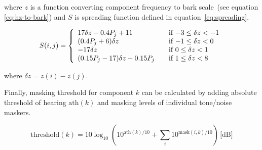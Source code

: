 \documentclass[english,bachelor,a4paper,oneside]{ppfcmthesis}
\begin{document}
where $z$ is a function converting component frequency to bark scale~(see equation \ref{eq:hz-to-bark}) and $S$ is spreading function defined in equation~\ref{eq:spreading}.

\begin{equation}
S(i, j) = \left\{
  \begin{array}{l l}
  17 \delta z -0.4 P_{j} + 11 & \quad \textrm{if $-3 \leq \delta z < -1$}\\
  (0.4P_{j} + 6) \delta z & \quad \textrm{if $-1 \leq \delta z < 0$}\\
  -17 \delta z & \quad \textrm{if $0 \leq \delta z < 1$}\\
  (0.15 P_{j} -17) \delta z - 0.15 P_{j} & \quad \textrm{if $1 \leq \delta z < 8$}
  \end{array}
\right.
\label{eq:spreading}
\end{equation}

where $\delta z = z(i) - z(j)$.


Finally, masking threshold for component $k$ can be calculated by adding absolute threshold of hearing $\textrm{ath}(k)$ and masking levels of individual tone/noise maskers.

\begin{equation}
\textrm{threshold}(k) = 10\log_{10}(10^{\textrm{ath}(k)/10} + \sum_{i} 10^{\textrm{mask}(i, k)/10} )\,\textrm{[dB]}
\end{equation}
\end{document}
